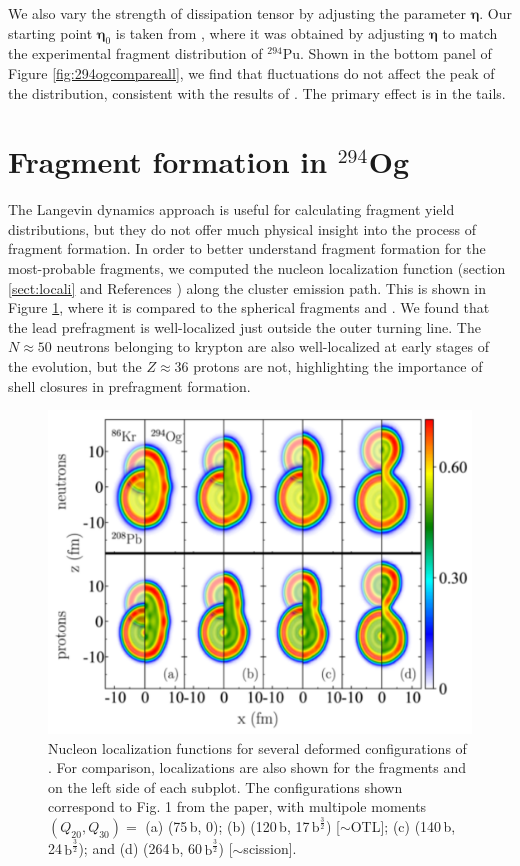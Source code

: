 We also vary the strength of dissipation tensor by adjusting the parameter $\mathbf{\eta}$. Our starting point $\mathbf{\eta}_0$ is taken from \cite{Sadhukhan2016}, where it was obtained by adjusting $\mathbf{\eta}$ to match the experimental fragment distribution of $^{294}$Pu. Shown in the bottom panel of Figure \ref{fig:294ogcompareall}, we find that fluctuations do not affect the peak of the distribution, consistent with the results of \cite{Randrup2011,Sierk2017,Sadhukhan2017}. The primary effect is in the tails.

\section{Fragment formation in $^{294}$Og}

The Langevin dynamics approach is useful for calculating fragment yield distributions, but they do not offer much physical insight into the process of fragment formation. In order to better understand fragment formation for the most-probable fragments, we computed the nucleon localization function (section \ref{sect:locali} and References \cite{Zhang2016,Sadhukhan2017}) along the cluster emission path. This is shown in Figure \ref{fig:294oglocali}, where it is compared to the spherical fragments {\Pb} and {\Kr}. We found that the lead prefragment is well-localized just outside the outer turning line. The $N\approx50$ neutrons belonging to krypton are also well-localized at early stages of the evolution, but the $Z\approx36$ protons are not, highlighting the importance of shell closures in prefragment formation.

\begin{figure}
	\centering
	\includegraphics[width=0.9\linewidth]{TeX_files/294Og_locali}
	\caption[Nucleon localization visualization of $^{294}$Og prefragment formation.]{Nucleon localization functions for several deformed configurations of {\Og}. For comparison, localizations are also shown for the fragments {\Pb} and {\Kr} on the left side of each subplot. The configurations shown correspond to Fig. 1 from the paper, with multipole moments $(Q_{20}, Q_{30})=$ (a) (75\,b, 0); (b) (120\,b, 17\,$\mathrm{b}^\frac{3}{2}$) [$\sim$OTL]; (c) (140\,b, 24\,$\mathrm{b}^\frac{3}{2}$); and (d) (264\,b, 60\,$\mathrm{b}^\frac{3}{2}$) [$\sim$scission].}
	\label{fig:294oglocali}
\end{figure}

